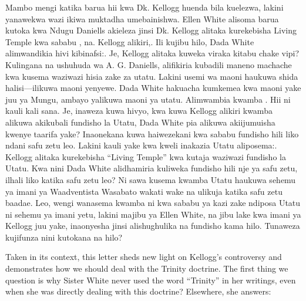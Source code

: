 Mambo mengi katika barua hii kwa Dk. Kellogg huenda bila kuelezwa, lakini yanawekwa wazi ikiwa muktadha umebainishwa. Ellen White alisoma barua kutoka kwa Ndugu Daniells akieleza jinsi Dk. Kellogg alitaka kurekebisha Living Temple kwa sababu , na. Kellogg alikiri,. Ili kujibu hilo, Dada White alimwandikia hivi kibinafsi:. Je, Kellogg alitaka kuweka viraka kitabu chake vipi? Kulingana na ushuhuda wa A. G. Daniells, alifikiria kubadili maneno machache kwa kusema waziwazi hisia zake za utatu. Lakini usemi wa maoni haukuwa shida halisi—ilikuwa maoni yenyewe. Dada White hakuacha kumkemea kwa maoni yake juu ya Mungu, ambayo yalikuwa maoni ya utatu. Alimwambia kwamba . Hii ni kauli kali sana. Je, inaweza kuwa hivyo, kwa kuwa Kellogg alikiri kwamba alikuwa akikubali fundisho la Utatu, Dada White pia alikuwa akiijumuisha kwenye taarifa yake? Inaonekana kuwa haiwezekani kwa sababu fundisho hili liko ndani safu zetu leo. Lakini kauli yake kwa kweli inakazia Utatu aliposema:. Kellogg alitaka kurekebisha “Living Temple” kwa kutaja waziwazi fundisho la Utatu. Kwa nini Dada White alidhamiria kuliweka fundisho hili nje ya safu zetu, ilhali liko katika safu zetu leo? Ni sawa kusema kwamba Utatu haukuwa sehemu ya imani ya Waadventista Wasabato wakati wake na ulikuja katika safu zetu baadae. Leo, wengi wanasema kwamba ni kwa sababu ya kazi zake ndiposa Utatu ni sehemu ya imani yetu, lakini majibu ya Ellen White, na jibu lake kwa imani ya Kellogg juu yake, inaonyesha jinsi alishughulika na fundisho kama hilo. Tunaweza kujifunza nini kutokana na hilo?


Taken in its context, this letter sheds new light on Kellogg’s controversy and demonstrates how we should deal with the Trinity doctrine. The first thing we question is why Sister White never used the word “Trinity” in her writings, even when she was directly dealing with this doctrine? Elsewhere, she answers:


